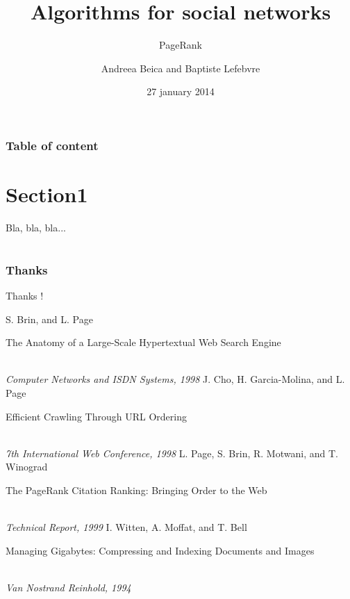 \documentclass[10pt]{beamer}
\begin{document}
  
  \title{Algorithms for social networks}
  \subtitle{PageRank}
  \author{Andreea Beica and Baptiste Lefebvre}
  \date{27 january 2014}
  \maketitle

  
\begin{frame}
  \frametitle{Table of content}
  \tableofcontents
\end{frame}


\section{Section1}

\begin{frame}
Bla, bla, bla...
\end{frame}


\section{}

\begin{frame}
  \frametitle{Thanks}
  \begin{center}
    \huge{Thanks !}
  \end{center}
\end{frame}

\begin{frame}
  \begin{thebibliography}{1}
      S. Brin, and L. Page\\
      \begin{bf} The Anatomy of a Large-Scale Hypertextual Web Search Engine \end{bf}\\
      \emph{Computer Networks and ISDN Systems, 1998}
      J. Cho, H. Garcia-Molina, and L. Page\\
      \begin{bf} Efficient Crawling Through URL Ordering \end{bf}\\
      \emph{7th International Web Conference, 1998}
      L. Page, S. Brin, R. Motwani, and T. Winograd\\
      \begin{bf} The PageRank Citation Ranking: Bringing Order to the Web \end{bf}\\
      \emph{Technical Report, 1999}
      I. Witten, A. Moffat, and T. Bell\\
      \begin{bf} Managing Gigabytes: Compressing and Indexing Documents and Images \end{bf}\\
      \emph{Van Nostrand Reinhold, 1994}
  \end{thebibliography}
\end{frame}
\end{document}

